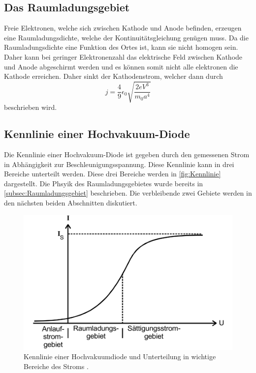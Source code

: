 \subsection{Das Raumladungsgebiet}
\label{subsec:Raumladungsgebiet}
Freie Elektronen, welche sich zwischen Kathode und Anode befinden, erzeugen eine Raumladungsdichte, welche der Kontinuitätsgleichung genügen muss. Da die Raumladungsdichte 
eine Funktion des Ortes ist, kann sie nicht homogen sein. Daher kann bei geringer Elektronenzahl das elektrische Feld zwischen Kathode und Anode abgeschirmt werden und es 
können somit nicht alle elektronen die Kathode erreichen. Daher sinkt der Kathodenstrom, welcher dann durch 
\begin{equation}
    \label{eqn:langmuirraumladung}
    j = \frac{4}{9}\epsilon_0\sqrt{\frac{2eV^3}{m_0a^4}}
\end{equation}
beschrieben wird.

\subsection{Kennlinie einer Hochvakuum-Diode}
\label{subsec:Kennlinie}
Die Kennlinie einer Hochvakuum-Diode ist gegeben durch den gemessenen Strom in Abhängigkeit zur Beschleunigungsspannung. Diese Kennlinie kann in drei Bereiche unterteilt werden.
Diese drei Bereiche werden in \autoref{fig:Kennlinie} dargestellt. Die Phsyik des Raumladungsgebietes wurde bereits in \autoref{subsec:Raumladungsgebiet} beschrieben.
Die verbleibende zwei Gebiete werden in den nächsten beiden Abschnitten diskutiert.

\begin{figure}
    \centering
    \includegraphics[width = .5\textwidth]{content/Kennlinie.png}
    \caption{Kennlinie einer Hochvakuumdiode und Unterteilung in wichtige Bereiche des Stroms \cite{v504}.}
    \label{fig:Kennlinie}
\end{figure}

